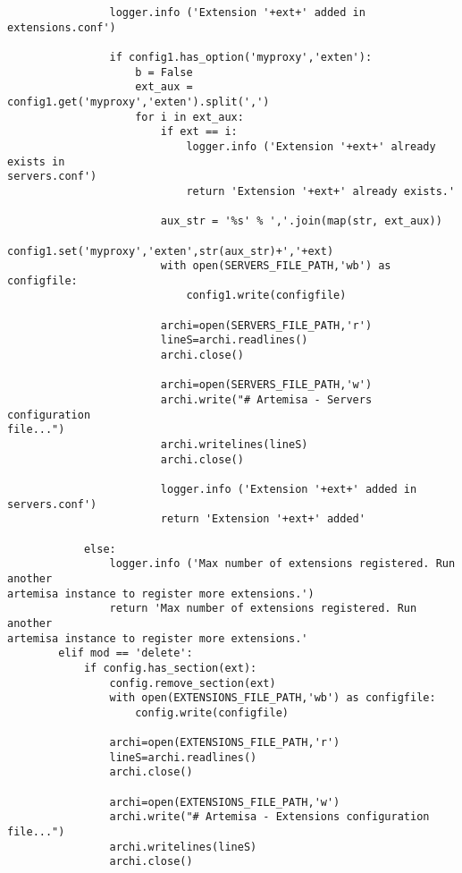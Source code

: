 \documentclass[a4paper,12pt]{report}
\newenvironment{myscriptlisting}
{\begin{list}{}{\setlength{\leftmargin}{1em}}\item\scriptsize\bfseries}
{\end{list}}
\begin{document}
{\begin{myscriptlisting}
\begin{verbatim}
                logger.info ('Extension '+ext+' added in extensions.conf')
            
                if config1.has_option('myproxy','exten'):
                    b = False
                    ext_aux = config1.get('myproxy','exten').split(',')
                    for i in ext_aux:
                        if ext == i:
                            logger.info ('Extension '+ext+' already exists in
servers.conf')
                            return 'Extension '+ext+' already exists.'
                       
                        aux_str = '%s' % ','.join(map(str, ext_aux))
                        config1.set('myproxy','exten',str(aux_str)+','+ext)
                        with open(SERVERS_FILE_PATH,'wb') as configfile:
                            config1.write(configfile)
                        
                        archi=open(SERVERS_FILE_PATH,'r')
                        lineS=archi.readlines()
                        archi.close()

                        archi=open(SERVERS_FILE_PATH,'w')                
                        archi.write("# Artemisa - Servers configuration
file...")
                        archi.writelines(lineS)
                        archi.close()
                                                
                        logger.info ('Extension '+ext+' added in servers.conf')
                        return 'Extension '+ext+' added'
                       
            else:
                logger.info ('Max number of extensions registered. Run another
artemisa instance to register more extensions.')
                return 'Max number of extensions registered. Run another
artemisa instance to register more extensions.'
        elif mod == 'delete':
            if config.has_section(ext):
                config.remove_section(ext)
                with open(EXTENSIONS_FILE_PATH,'wb') as configfile:
                    config.write(configfile)
                
                archi=open(EXTENSIONS_FILE_PATH,'r')
                lineS=archi.readlines()
                archi.close()

                archi=open(EXTENSIONS_FILE_PATH,'w')                
                archi.write("# Artemisa - Extensions configuration file...")
                archi.writelines(lineS)
                archi.close()
                

\end{verbatim}
\end{myscriptlisting}}
\end{document}
